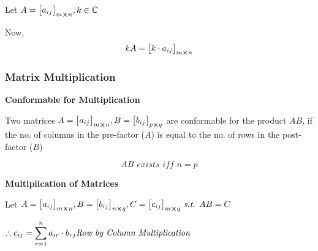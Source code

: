 \documentclass{article}
\begin{document}
Let $A={\begin{bmatrix}
        a_{ij}
    \end{bmatrix}}_{m \cross n}, k \in \mathbb{C}$

Now, $$kA={\begin{bmatrix}
        k \cdot a_{ij}
    \end{bmatrix}}_{m \cross n} $$

\subsubsection{Matrix Multiplication}

\textbf{Conformable for Multiplication}

Two matrices $A={\begin{bmatrix}
        a_{ij}
    \end{bmatrix}}_{m \cross n}, B={\begin{bmatrix}
                b_{ij}
            \end{bmatrix}}_{p \cross q} $ are conformable for the product $AB$, if the no. of columns in the pre-factor ($A$) is equal to the no. of rows in the post-factor ($B$)

$$AB \textit{ exists iff } n=p $$

\textbf{Multiplication of Matrices}


Let $A={\begin{bmatrix}
        a_{ij}
    \end{bmatrix}}_{m \cross n}, B={\begin{bmatrix}
                b_{ij}
            \end{bmatrix}}_{n \cross q}, C= {\begin{bmatrix}
                c_{ij}
            \end{bmatrix}}_{m \cross q} \textit{ s.t. } AB=C $

$\therefore c_{ij}=\displaystyle\sum_{r=1}^{n} a_{ir} \cdot b_{rj} \hfill \textit{Row by Column Multiplication}$
\end{document}
